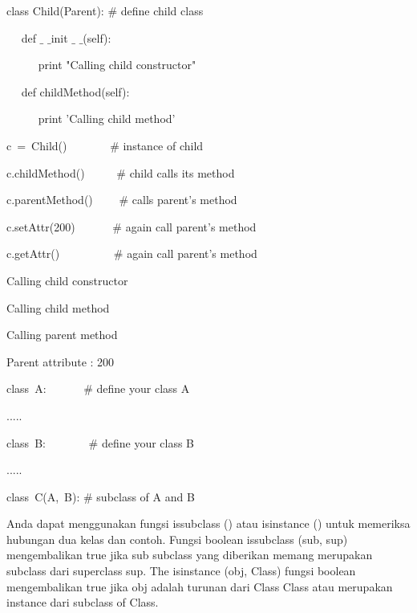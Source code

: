 \vspace{12pt}
\noindent 
class Child(Parent):  $  \#  $ define child class \par
\noindent 
~~ def  $  \_  $ $  \_  $init $  \_  $ $  \_  $(self): \par
\noindent 
~~~~~ print "Calling child constructor" \par
\vspace{12pt}
\noindent 
~~ def childMethod(self): \par
\noindent 
~~~~~ print 'Calling child method' \par
\vspace{12pt}
\noindent 
c~=~Child()~~~~~~~    $  \#  $ instance of child \par
\noindent 
c.childMethod()~~~~~  $  \#  $ child calls its method \par
\noindent 
c.parentMethod()~~~~  $  \#  $ calls parent's method \par
\noindent 
c.setAttr(200)~~~~~~  $  \#  $ again call parent's method \par
\noindent 
c.getAttr()~~~~~~~~~  $  \#  $ again call parent's method \par
\vspace{12pt}
\noindent 
Calling child constructor \par
\noindent 
Calling child method \par
\noindent 
Calling parent method \par
\noindent 
Parent attribute : 200 \par
\vspace{12pt}
\noindent 
class~A:~~~~~~   $  \#  $ define your class A \par
\noindent 
..... \par
\vspace{12pt}
\noindent 
class~B:~~~~~~~   $  \#  $ define your class B \par
\noindent 
..... \par
\vspace{12pt}
\noindent 
class~C(A,~B):    $  \#  $ subclass of A and B \par
\vspace{12pt}
Anda dapat menggunakan fungsi issubclass () atau isinstance () untuk memeriksa hubungan dua kelas dan contoh. Fungsi boolean issubclass (sub, sup) mengembalikan true jika sub subclass yang diberikan memang merupakan subclass dari superclass sup. The isinstance (obj, Class) fungsi boolean mengembalikan true jika obj adalah turunan dari Class Class atau merupakan instance dari subclass of Class. \par
